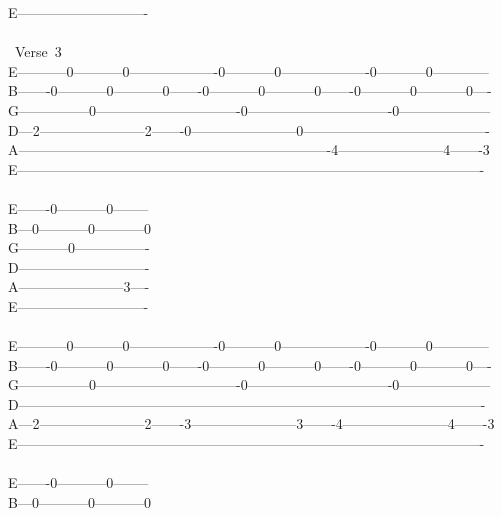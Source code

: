 {E----------------------------\\
\\
\lbrack\ Verse\ 3\rbrack\\
E-----------0-----------0-------------------0-----------0-------------------0-----------0------------\\
B-------0-----------0-----------0-------0-----------0-----------0-------0-----------0-----------0----\\
G---------------0-------------------------------0-------------------------------0--------------------\\
D---2-----------------------2-------0-----------------------0----------------------------------------\\
A-------------------------------------------------------------------4-----------------------4-------3\\
E----------------------------------------------------------------------------------------------------\\
\\
E-------0-----------0--------\\
B---0-----------0-----------0\\
G-----------0----------------\\
D----------------------------\\
A-----------------------3----\\
E----------------------------\\
\\
E-----------0-----------0-------------------0-----------0-------------------0-----------0------------\\
B-------0-----------0-----------0-------0-----------0-----------0-------0-----------0-----------0----\\
G---------------0-------------------------------0-------------------------------0--------------------\\
D----------------------------------------------------------------------------------------------------\\
A---2-----------------------2-------3-----------------------3-------4-----------------------4-------3\\
E----------------------------------------------------------------------------------------------------\\
\ \ \ \ \ \ \ \ \ \ \ \ \ \ \ \ \ \ \ \ \ \ \ \ \ \ \\
E-------0-----------0--------\\
B---0-----------0-----------0\\
}
